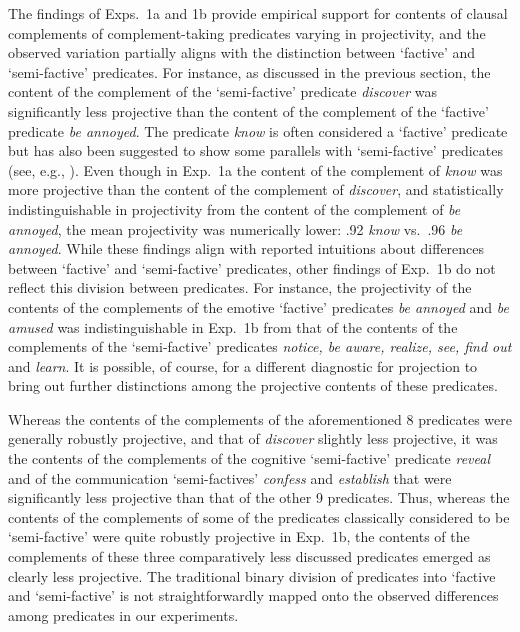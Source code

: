 \documentclass[11pt,fleqn]{article}
\newcommand{\6}{\mbox{$[\hspace*{-.6mm}[$}}
\newcommand{\9}{\mbox{$]\hspace*{-.6mm}]$}}
\begin{document}
The findings of Exps.~1a and 1b provide empirical support for contents of clausal complements of complement-taking predicates varying in projectivity, and the observed variation partially aligns with the distinction between `factive' and `semi-factive' predicates. For instance, as discussed in the previous section, the content of the complement of the `semi-factive' predicate {\em discover} was significantly less projective than the content of the complement of the `factive' predicate {\em be annoyed}. The predicate {\em know} is often considered a `factive' predicate but has also been suggested to show some parallels with `semi-factive' predicates (see, e.g., \citealt{kiparsky-kiparsky71,levinson83,simons01,beaver-geurts-sep}). Even though in Exp.~1a the content of the complement of {\em know} was more projective than the content of the complement of {\em discover}, and statistically indistinguishable in projectivity from the content of the complement of {\em be annoyed}, the mean projectivity was numerically lower: .92 {\em know} vs.\ .96 {\em be annoyed}. While these findings align with reported intuitions about differences between `factive' and `semi-factive' predicates, other findings of Exp.~1b do not reflect this division between predicates. For instance, the projectivity of the contents of the complements of the emotive `factive' predicates {\em be annoyed} and {\em be amused} was indistinguishable in Exp.~1b from that of the contents of the complements of the `semi-factive' predicates {\em notice, be aware, realize, see, find out} and {\em learn}. It is possible, of course, for a different diagnostic for projection to bring out further distinctions among the projective contents of these predicates.

Whereas the contents of the complements of the aforementioned 8 predicates were generally robustly projective, and that of {\em discover} slightly less projective, it was the contents of the complements of the cognitive `semi-factive' predicate {\em reveal} and of the communication `semi-factives' {\em confess} and {\em establish} that were significantly less projective than that of the other 9 predicates. Thus, whereas the contents of the complements of some of the predicates classically considered to be `semi-factive' were quite robustly projective in Exp.~1b, the contents of the complements of these three comparatively less discussed predicates emerged as clearly less projective. The traditional binary division of predicates into `factive and `semi-factive' is not straightforwardly mapped onto the observed differences among predicates in our experiments.
\end{document}
